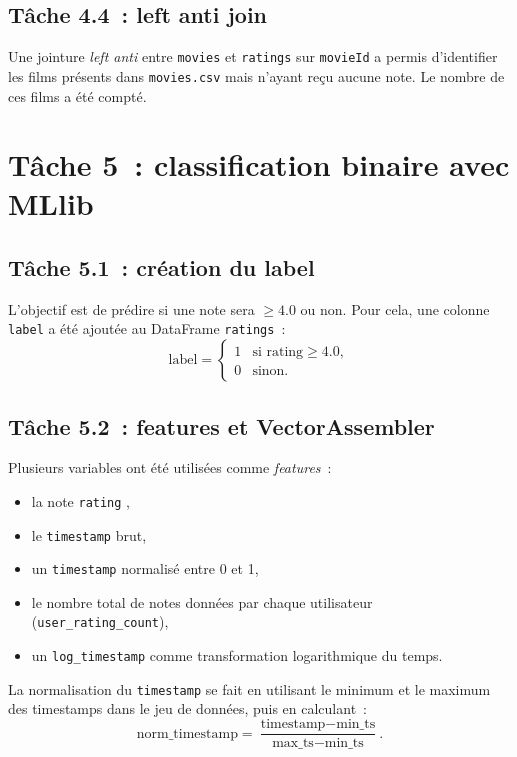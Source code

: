 \documentclass[a4paper,11pt]{article}
\begin{document}
\subsection{Tâche 4.4~: left anti join}

Une jointure \emph{left anti} entre \texttt{movies} et \texttt{ratings}
sur \texttt{movieId} a permis d'identifier les films présents dans
\texttt{movies.csv} mais n'ayant reçu aucune note. Le nombre de ces
films a été compté.

\section{Tâche 5~: classification binaire avec MLlib}

\subsection{Tâche 5.1~: création du label}

L'objectif est de prédire si une note sera $\geq 4.0$ ou non.
Pour cela, une colonne \texttt{label} a été ajoutée au DataFrame
\texttt{ratings}~:
\[
  \text{label} =
  \begin{cases}
    1 & \text{si } \text{rating} \geq 4.0, \\
    0 & \text{sinon.}
  \end{cases}
\]

\subsection{Tâche 5.2~: features et VectorAssembler}

Plusieurs variables ont été utilisées comme \emph{features}~:
\begin{itemize}
  \item la note \texttt{rating} ,
  \item le \texttt{timestamp} brut,
  \item un \texttt{timestamp} normalisé entre 0 et 1,
  \item le nombre total de notes données par chaque utilisateur
        (\texttt{user\_rating\_count}),
  \item un \texttt{log\_timestamp} comme transformation logarithmique
        du temps.
\end{itemize}

La normalisation du \texttt{timestamp} se fait en utilisant le
minimum et le maximum des timestamps dans le jeu de données,
puis en calculant~:
\[
  \text{norm\_timestamp} =
  \frac{\text{timestamp} - \text{min\_ts}}{\text{max\_ts} - \text{min\_ts}}.
\]
\end{document}
